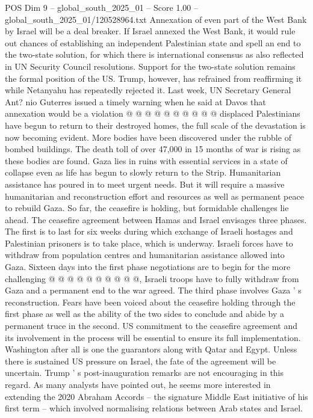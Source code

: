 \begin{textsample}{POS Dim 9 – global\_south\_2025\_01 – Score 1.00 – global\_south\_2025\_01/120528964.txt}
Annexation of even part of the West Bank by Israel will be a deal breaker.
If Israel annexed the West Bank, it would rule out chances of establishing an independent Palestinian state and spell an end to the two-state solution, for which there is international consensus as also reflected in UN Security Council resolutions.
Support for the two-state solution remains the formal position of the US.
Trump, however, has refrained from reaffirming it while Netanyahu has repeatedly rejected it.
Last week, UN Secretary General Ant? nio Guterres issued a timely warning when he said at Davos that annexation would be a violation @ @ @ @ @ @ @ @ @ @ displaced Palestinians have begun to return to their destroyed homes, the full scale of the devastation is now becoming evident.
More bodies have been discovered under the rubble of bombed buildings.
The death toll of over 47,000 in 15 months of war is rising as these bodies are found.
Gaza lies in ruins with essential services in a state of collapse even as life has begun to slowly return to the Strip.
Humanitarian assistance has poured in to meet urgent needs.
But it will require a massive humanitarian and reconstruction effort and resources as well as permanent peace to rebuild Gaza.
So far, the ceasefire is holding, but formidable challenges lie ahead.
The ceasefire agreement between Hamas and Israel envisages three phases.
The first is to last for six weeks during which exchange of Israeli hostages and Palestinian prisoners is to take place, which is underway.
Israeli forces have to withdraw from population centres and humanitarian assistance allowed into Gaza.
Sixteen days into the first phase negotiations are to begin for the more challenging @ @ @ @ @ @ @ @ @ @, Israeli troops have to fully withdraw from Gaza and a permanent end to the war agreed.
The third phase involves Gaza ' s reconstruction.
Fears have been voiced about the ceasefire holding through the first phase as well as the ability of the two sides to conclude and abide by a permanent truce in the second.
US commitment to the ceasefire agreement and its involvement in the process will be essential to ensure its full implementation.
Washington after all is one the guarantors along with Qatar and Egypt.
Unless there is sustained US pressure on Israel, the fate of the agreement will be uncertain.
Trump ' s post-inauguration remarks are not encouraging in this regard.
As many analysts have pointed out, he seems more interested in extending the 2020 Abraham Accords -- the signature Middle East initiative of his first term -- which involved normalising relations between Arab states and Israel.

\end{textsample}
